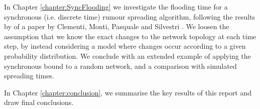In Chapter \ref{chapter:SyncFlooding} we investigate the flooding time for a synchronous (i.e. discrete time) rumour spreading algorithm, following the results by of a paper by Clementi, Monti, Pasquale and Silvestri \cite{syncPaper}. We loosen the assumption that we know the exact changes to the network topology at each time step, by instead considering a model where changes occur according to a given probability distribution. We conclude with an extended example of applying the synchronous bound to a random network, and a comparison with simulated spreading times. 

In Chapter \ref{chapter:conclusion}, we summarise the key results of this report and draw final conclusions.
